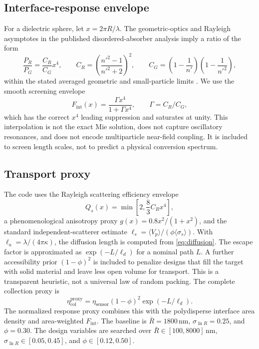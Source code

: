 \documentclass[10.5pt,a4paper]{article}
\newcommand{\nm}{\,\mathrm{nm}}
\begin{document}
\subsection{Interface-response envelope}
For a dielectric sphere, let $x=2\pi R/\lambda$. The geometric-optics and Rayleigh asymptotes in the published disordered-absorber analysis imply a ratio of the form
\begin{equation}
\frac{P_R}{P_G}=\frac{C_R}{C_G}x^4,\qquad
C_R=\left(\frac{n'^2-1}{n'^2+2}\right)^2,\qquad
C_G=\left(1-\frac1{n'}\right)\left(1-\frac1{n'^2}\right),
\label{eq:asymptoteratio}
\end{equation}
within the stated averaged geometric and small-particle limits \parencite{Koppell2026}. We use the smooth screening envelope
\begin{equation}
F_{\mathrm{int}}(x)=\frac{\Gamma x^4}{1+\Gamma x^4},\qquad \Gamma=C_R/C_G,
\label{eq:kernel}
\end{equation}
which has the correct $x^4$ leading suppression and saturates at unity. This interpolation is not the exact Mie solution, does not capture oscillatory resonances, and does not encode multiparticle near-field coupling. It is included to screen length scales, not to predict a physical conversion spectrum.

\subsection{Transport proxy}
The code uses the Rayleigh scattering efficiency envelope
\begin{equation}
Q_s(x)=\min\!\left[2,\frac{8}{3}C_Rx^4\right],
\label{eq:qs}
\end{equation}
a phenomenological anisotropy proxy $g(x)=0.8x^2/(1+x^2)$, and the standard independent-scatterer estimate $\ell_s=\langle V_p\rangle/(\phi\langle\sigma_s\rangle)$. With $\ell_a=\lambda/(4\pi\kappa)$, the diffusion length is computed from \cref{eq:diffusion}. The escape factor is approximated as $\exp(-L/\ell_d)$ for a nominal path $L$. A further accessibility prior $(1-\phi)^2$ is included to penalize designs that fill the target with solid material and leave less open volume for transport. This is a transparent heuristic, not a universal law of random packing. The complete collection proxy is
\begin{equation}
\eta_{\mathrm{col}}^{\mathrm{proxy}}=\eta_{\mathrm{sensor}}(1-\phi)^2\exp(-L/\ell_d).
\label{eq:etaproxy}
\end{equation}
The normalized response proxy combines this with the polydisperse interface area density and area-weighted $F_{\mathrm{int}}$. The baseline is $\bar R=1800\nm$, $\sigma_{\ln R}=0.25$, and $\phi=0.30$. The design variables are searched over $\bar R\in[100,8000]\nm$, $\sigma_{\ln R}\in[0.05,0.45]$, and $\phi\in[0.12,0.50]$.
\end{document}
